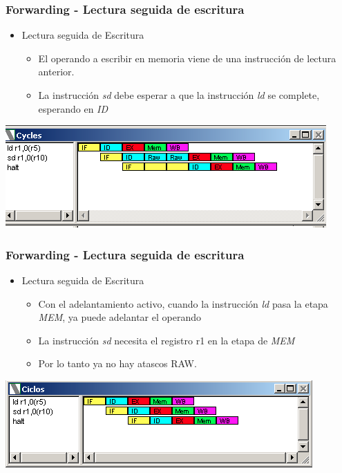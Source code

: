 \documentclass{beamer}
\begin{document}
\begin{frame}[fragile]
\frametitle{Forwarding - Lectura seguida de escritura}
\begin{itemize}
\item Lectura seguida de Escritura
\begin{itemize}
\item El operando a escribir en memoria viene de una instrucción de lectura anterior.
\item La instrucción \emph{sd} debe esperar a que la instrucción \emph{ld} se complete, esperando en \emph{ID}
\end{itemize}
\end{itemize}
\includegraphics[scale=0.45]{forwarding-1.png}
\end{frame}

\begin{frame}[fragile]
\frametitle{Forwarding - Lectura seguida de escritura}
\begin{itemize}
\item Lectura seguida de Escritura
\begin{itemize}
\item Con el adelantamiento activo, cuando la instrucción \emph{ld} pasa la etapa \emph{MEM}, ya puede adelantar el operando
\item La instrucción \emph{sd} necesita el registro r1 en la etapa de \emph{MEM}
\item Por lo tanto ya no hay atascos RAW.
\end{itemize}
\end{itemize}
\includegraphics[scale=0.45]{forwarding-1-lectura-escritura.png}
\end{frame}
\end{document}
